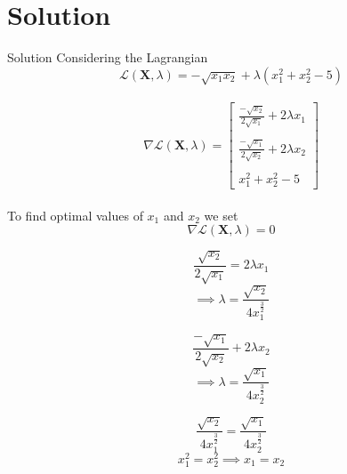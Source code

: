 \documentclass{beamer}
\begin{document}
\section{Solution}
\begin{frame}{Solution}
Considering the Lagrangian\\
\begin{equation*}
\mathcal{L}(\textbf{X},\lambda)= -\sqrt{x_{1}x_{2}} + \lambda( x_{1}^{2} + x_{2}^{2} - 5)
\end{equation*}
\\
\begin{equation*}
\nabla\mathcal{L}(\textbf{X},\lambda)=
    \begin{bmatrix}
    \displaystyle\frac{-\sqrt{x_{2}}}{2\sqrt{x_{1}}} + 2\lambda x_{1}\\
    \\
    \displaystyle\frac{-\sqrt{x_{1}}}{2\sqrt{x_{2}}} + 2\lambda x_{2}\\
    \\
    x_{1}^{2} + x_{2}^{2} - 5
\end{bmatrix}
\end{equation*}
\\
To find optimal values of $x_{1}$ and $x_{2}$ we set 
\begin{equation*}
\nabla\mathcal{L}(\textbf{X},\lambda)=0
\end{equation*}
\end{frame}

\begin{frame}

\begin{equation}
\displaystyle\frac{\sqrt{x_{2}}}{2\sqrt{x_{1}}} = 2\lambda x_{1}
\end{equation}
\begin{equation*}
\implies \lambda=\displaystyle\frac{\sqrt{x_{2}}}{4x_{1}^{\frac{3}{2}}}     
\end{equation*}

\begin{equation}
     \displaystyle\frac{-\sqrt{x_{1}}}{2\sqrt{x_{2}}} + 2\lambda x_{2}
\end{equation}
\begin{equation*}
\implies \lambda=\displaystyle\frac{\sqrt{x_{1}}}{4x_{2}^{\frac{3}{2}}}
\end{equation*}

\begin{equation*}
   \frac{\sqrt{x_{2}}}{4x_{1}^{\frac{3}{2}}}=  \frac{\sqrt{x_{1}}}{4x_{2}^{\frac{3}{2}}}  
\end{equation*}
\begin{equation*}
x_{1}^{2} = x_{2}^{2}
\implies x_{1} = x_{2}
\end{equation*}
\end{frame}
\end{document}

